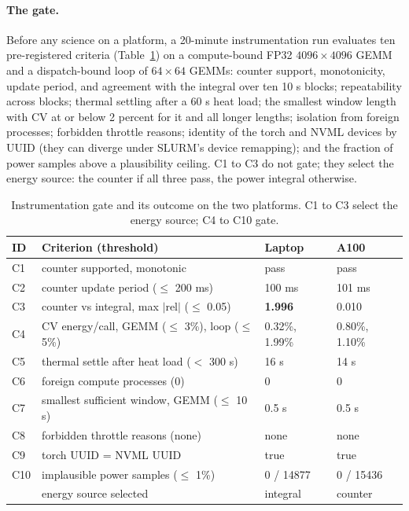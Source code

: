 \documentclass{article}
\begin{document}
\paragraph{The gate.} Before any science on a platform, a 20-minute instrumentation run evaluates ten pre-registered criteria (Table~\ref{tab:gate}) on a compute-bound FP32 $4096 \times 4096$ GEMM and a dispatch-bound loop of $64 \times 64$ GEMMs: counter support, monotonicity, update period, and agreement with the integral over ten 10 s blocks; repeatability across blocks; thermal settling after a 60 s heat load; the smallest window length with CV at or below 2 percent for it and all longer lengths; isolation from foreign processes; forbidden throttle reasons; identity of the torch and NVML devices by UUID (they can diverge under SLURM's device remapping); and the fraction of power samples above a plausibility ceiling. C1 to C3 do not gate; they select the energy source: the counter if all three pass, the power integral otherwise.

\begin{table}[t]
\caption{Instrumentation gate and its outcome on the two platforms. C1 to C3 select the energy source; C4 to C10 gate.}
\label{tab:gate}
\vskip 0.1in
\centering
\small
\begin{tabular}{@{}llll@{}}
\toprule
ID & Criterion (threshold) & Laptop & A100 \\
\midrule
C1 & counter supported, monotonic & pass & pass \\
C2 & counter update period ($\leq$ 200 ms) & 100 ms & 101 ms \\
C3 & counter vs integral, max $|$rel$|$ ($\leq$ 0.05) & \textbf{1.996} & 0.010 \\
C4 & CV energy/call, GEMM ($\leq$ 3\%), loop ($\leq$ 5\%) & 0.32\%, 1.99\% & 0.80\%, 1.10\% \\
C5 & thermal settle after heat load ($<$ 300 s) & 16 s & 14 s \\
C6 & foreign compute processes (0) & 0 & 0 \\
C7 & smallest sufficient window, GEMM ($\leq$ 10 s) & 0.5 s & 0.5 s \\
C8 & forbidden throttle reasons (none) & none & none \\
C9 & torch UUID = NVML UUID & true & true \\
C10 & implausible power samples ($\leq$ 1\%) & 0 / 14877 & 0 / 15436 \\
\midrule
 & energy source selected & integral & counter \\
\bottomrule
\end{tabular}
\end{table}
\end{document}
